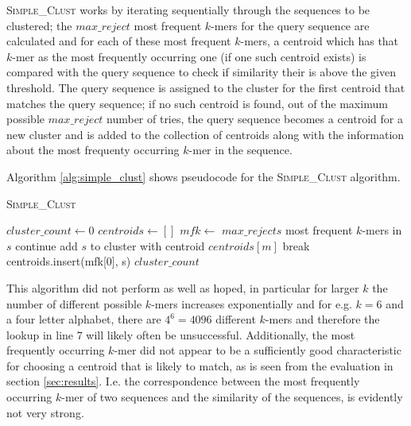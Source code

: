 
\textsc{Simple\_Clust} works by iterating sequentially through the sequences to
be clustered; the $max\_reject$ most frequent $k$-mers for the query sequence
are calculated and for each of these most frequent $k$-mers, a centroid which
has that $k$-mer as the most frequently occurring one (if one such centroid
exists) is compared with the query sequence to check if similarity their is
above the given threshold. The query sequence is assigned to the cluster for
the first centroid that matches the query sequence; if no such centroid is
found, out of the maximum possible $max\_reject$ number of tries, the query
sequence becomes a centroid for a new cluster and is added to the collection of
centroids along with the information about the most frequenty occurring $k$-mer
in the sequence.  %


Algorithm \ref{alg:simple_clust} shows pseudocode for the
\textsc{Simple\_Clust} algorithm.

\begin{algorithm}
  \caption{\textsc{Simple\_Clust}}
  \label{alg:simple_clust}
  \begin{algorithmic}[1]
    \Statex
      \State $cluster\_count \gets 0$
      \State $centroids \gets []$ 
        \State $mfk \gets$ $max\_rejects$ most frequent $k$-mers in $s$
            \State continue
            \State add $s$ to cluster with centroid $centroids[m]$
            \State break
          \EndIf
        \EndFor
          \State centroids.insert(mfk[0], s)
        \EndIf
      \EndFor
      \State \Return $cluster\_count$
    \EndFunction
  \end{algorithmic}
\end{algorithm}


This algorithm did not perform as well as hoped, in particular for larger $k$
the number of different possible $k$-mers increases exponentially and for e.g.
$k = 6$ and a four letter alphabet, there are $4^6 = 4096$ different $k$-mers
and therefore the lookup in line 7 will likely often be unsuccessful.
Additionally, the most frequently occurring $k$-mer did not appear to be a
sufficiently good characteristic for choosing a centroid that is likely to
match, as is seen from the evaluation in section \ref{sec:results}. I.e. the
correspondence between the most frequently occurring $k$-mer of two sequences
and the similarity of the sequences, is evidently not very strong.  %


